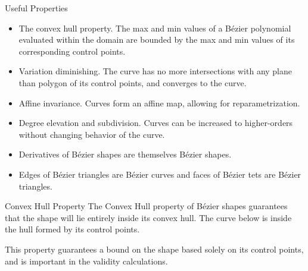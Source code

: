 \documentclass[12pt]{beamer}
\begin{document}
\begin{frame}{Useful Properties}
\begin{itemize}
 \item The convex hull property. The max and min values of a B\'{e}zier polynomial evaluated within the domain are bounded by the max and min values of its corresponding control points.
 \item Variation diminishing. The curve has no more intersections with any plane than polygon of its control points, and converges to the curve.
 \item Affine invariance. Curves form an affine map, allowing for reparametrization. 
 \item Degree elevation and subdivision. Curves can be increased to higher-orders without changing behavior of the curve.
 \item Derivatives of B{\'e}zier  shapes are themselves B{\'e}zier shapes.
 \item Edges of B{\'e}zier triangles are B{\'e}zier curves and faces of B{\'e}zier tets are B{\'e}zier triangles.
\end{itemize}

\end{frame}
\begin{frame}{Convex Hull Property}
The Convex Hull property of B{\'e}zier shapes guarantees that the shape will lie entirely inside its convex hull. The curve below is inside the hull formed by its control points.
\begin{figure}
\centering
{}
\end{figure}
This property guarantees a bound on the shape based solely on its control points, and is important in the validity calculations.
\end{frame}
\end{document}
